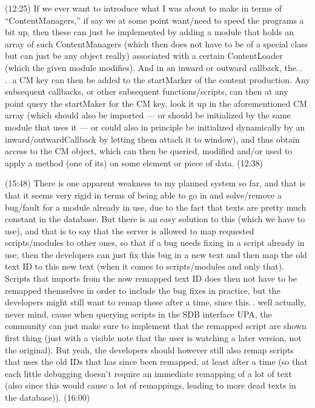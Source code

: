 \documentclass{report}
\begin{document}
(12:25) If we ever want to introduce what I was about to make in terms of ``ContentManagers,'' if say we at some point want/need to speed the programs a bit up, then these can just be implemented by adding a module that holds an array of such ContentManagers (which then does not have to be of a special class but can just be any object really) associated with a certain ContentLoader (which the given module modifies). And in an inward or outward callback, the.\,. %
.\,.\,a CM key can then be added to the startMarker of the content production. Any subsequent callbacks, or other subsequent functions/scripts, can then at any point query the startMaker for the CM key, look it up in the aforementioned CM array (which should also be imported --- or should be initialized by the same module that uses it --- or could also in principle be initialized dynamically by an inward/outwardCallback by letting them attach it to window), and thus obtain access to the CM object, which can then be queried, modified and/or used to apply a method (one of its) on some element or piece of data. (12:38)

(15:48) There is one apparent weakness to my planned system so far, and that is that it seems very rigid in terms of being able to go in and solve/remove a bug/fault for a module already in use, due to the fact that texts are pretty much constant in the database. But there is an easy solution to this (which we have to use), and that is to say that the server is allowed to map requested scripts/modules to other ones, so that if a bug needs fixing in a script already in use, then the developers can just fix this bug in a new text and then map the old text ID to this new text (when it comes to scripts/modules and only that). Scripts that imports from the now remapped text ID does then not have to be remapped themselves in order to include the bug fixes in practice, but the developers might still want to remap these after a time, since this.\,. well actually, never mind, cause when querying scripts in the SDB interface UPA, the community can just make sure to implement that the remapped script are shown first thing (just with a visible note that the user is watching a later version, not the original). But yeah, the developers should however still also remap scripts that uses the old IDs that has since been remapped, at least after a time (so that each little debugging doesn't require an immediate remapping of a lot of text (also since this would cause a lot of remappings, leading to more dead texts in the database)). (16:00)
\end{document}
